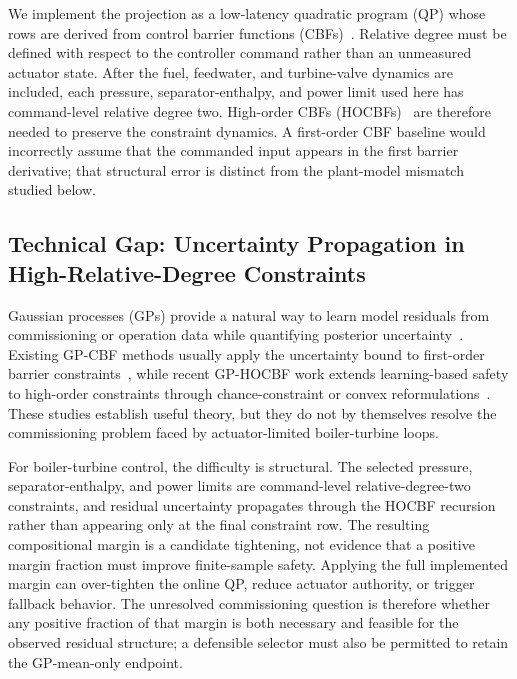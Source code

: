 We implement the projection as a low-latency quadratic program (QP) whose rows are derived from control barrier functions (CBFs)~\cite{ames2017cbf}. Relative degree must be defined with respect to the controller command rather than an unmeasured actuator state. After the fuel, feedwater, and turbine-valve dynamics are included, each pressure, separator-enthalpy, and power limit used here has command-level relative degree two. High-order CBFs (HOCBFs)~\cite{xiao2021hocbf} are therefore needed to preserve the constraint dynamics. A first-order CBF baseline would incorrectly assume that the commanded input appears in the first barrier derivative; that structural error is distinct from the plant-model mismatch studied below.

\subsection{Technical Gap: Uncertainty Propagation in High-Relative-Degree Constraints}

Gaussian processes (GPs) provide a natural way to learn model residuals from commissioning or operation data while quantifying posterior uncertainty~\cite{rasmussen2006gp,srinivas2010gp}. Existing GP-CBF methods usually apply the uncertainty bound to first-order barrier constraints~\cite{cheng2019guaranteed,fisac2018general,castaneda2021pointwise}, while recent GP-HOCBF work extends learning-based safety to high-order constraints through chance-constraint or convex reformulations~\cite{aali2024learning,zhang2025adaptive}. These studies establish useful theory, but they do not by themselves resolve the commissioning problem faced by actuator-limited boiler-turbine loops.

For boiler-turbine control, the difficulty is structural. The selected pressure, separator-enthalpy, and power limits are command-level relative-degree-two constraints, and residual uncertainty propagates through the HOCBF recursion rather than appearing only at the final constraint row. The resulting compositional margin is a candidate tightening, not evidence that a positive margin fraction must improve finite-sample safety. Applying the full implemented margin can over-tighten the online QP, reduce actuator authority, or trigger fallback behavior. The unresolved commissioning question is therefore whether any positive fraction of that margin is both necessary and feasible for the observed residual structure; a defensible selector must also be permitted to retain the GP-mean-only endpoint.

